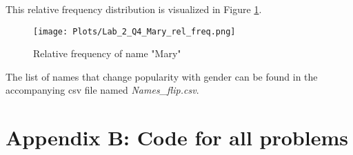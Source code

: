 \documentclass[12pt]{article}%
\begin{document}
This relative frequency distribution is visualized in Figure \ref{fig:Q4_relfreq}.\\

\begin{figure}
\texttt{[image: Plots/Lab\_2\_Q4\_Mary\_rel\_freq.png]}
\centering
\caption{Relative frequency of name "Mary"}
\label{fig:Q4_relfreq}
\centering
\end{figure}


The list of names that change popularity with gender can be found in the accompanying csv file named \emph{Names\_flip.csv}.




\newpage


\section*{Appendix B: Code for all problems}
\end{document}
